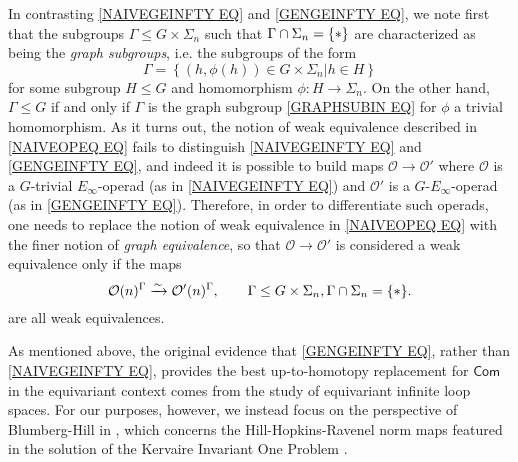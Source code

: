 \documentclass[a4paper,10pt
,draft
]{article}%
\numberwithin{equation}{section}
\numberwithin{figure}{section}
\theoremstyle{definition} %
\renewcommand{\O}{\ensuremath{\mathcal O}}
\newcommand{\1}{\ensuremath{\mathbbm 1}}%
\begin{document}
In contrasting 
\eqref{NAIVEGEINFTY EQ} and \eqref{GENGEINFTY EQ},
we note first that the subgroups $\Gamma \leq G \times \Sigma_n$ such that $\Gamma \cap \Sigma_n = \{\**\}$
are characterized as being the 
\emph{graph subgroups},
i.e. the subgroups of the form
\begin{equation}\label{GRAPHSUBIN EQ}
	\Gamma = \left\{(h,\phi(h)) \in G \times \Sigma_n
	| h \in H\right\}
\end{equation}
for some subgroup $H \leq G$ and homomorphism
$\phi \colon H \to \Sigma_n$.
On the other hand, $\Gamma \leq G$ if and only if $\Gamma$ is the graph subgroup \eqref{GRAPHSUBIN EQ} for $\phi$ a trivial homomorphism. 
As it turns out,
the notion of weak equivalence described in \eqref{NAIVEOPEQ EQ} fails to distinguish
\eqref{NAIVEGEINFTY EQ} and \eqref{GENGEINFTY EQ}, 
and indeed it is possible
to build maps $\O \to \O'$ where
$\O$ is a $G$-trivial $E_{\infty}$-operad (as in \eqref{NAIVEGEINFTY EQ})
and $\O'$ is a $G$-$E_{\infty}$-operad 
(as in \eqref{GENGEINFTY EQ}).
Therefore, in order to differentiate such operads, one needs to replace the notion of weak equivalence in \eqref{NAIVEOPEQ EQ} 
with the finer notion of \textit{graph equivalence}, 
so that $\O \to \O'$ is considered a weak equivalence only if
the maps
\begin{equation}\label{GENEOPEQ EQ}
	\O(n)^{\Gamma} \xrightarrow{\sim} \O'(n)^{\Gamma}, \qquad
	\Gamma \leq G\times \Sigma_n, \Gamma \cap \Sigma_n = \{\**\}.
\end{equation}
are all weak equivalences.

As mentioned above, the original evidence \cite{CW91}
that \eqref{GENGEINFTY EQ}, 
rather than \eqref{NAIVEGEINFTY EQ}, 
provides the best up-to-homotopy replacement for $\mathsf{Com}$ in the equivariant context comes from the study of equivariant infinite loop spaces. %
For our purposes, however, we instead focus on the perspective of Blumberg-Hill in \cite{BH15},
which concerns the Hill-Hopkins-Ravenel norm maps featured in the solution of the Kervaire Invariant One Problem \cite{HHR}.
\end{document}
